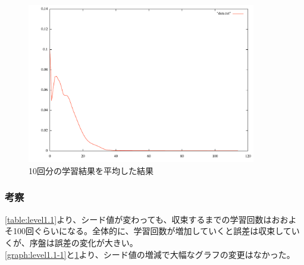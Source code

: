 \begin{figure}[h]
 \begin{center}
  \includegraphics[width=10.0cm]{figs/ex_ave.pdf}
  \caption{10回分の学習結果を平均した結果}
  \label{graph:level1.1-2}
 \end{center}
\end{figure}

\subsubsection{考察}
\ref{table:level1.1}より、シード値が変わっても、収束するまでの学習回数はおおよそ100回ぐらいになる。全体的に、学習回数が増加していくと誤差は収束していくが、序盤は誤差の変化が大きい。\\
\ref{graph:level1.1-1}と\ref{graph:level1.1-2}より、シード値の増減で大幅なグラフの変更はなかった。
